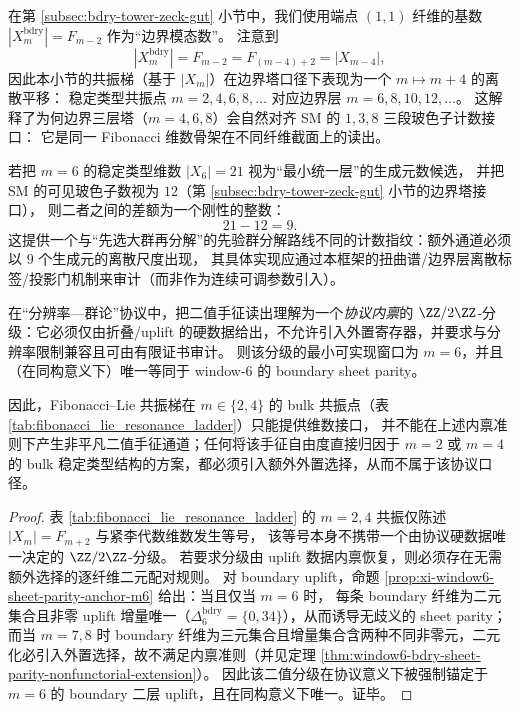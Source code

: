 \begin{remark}[与边界词塔的四步平移]\label{rem:fib-lie-resonance-shift-by-4}
在第 \ref{subsec:bdry-tower-zeck-gut} 小节中，我们使用端点 \((1,1)\) 纤维的基数
\(
|X_m^{\mathrm{bdry}}|=F_{m-2}
\)
作为“边界模态数”。
注意到
\[
|X_m^{\mathrm{bdry}}|=F_{m-2}=F_{(m-4)+2}=|X_{m-4}|,
\]
因此本小节的共振梯（基于 \(|X_m|\)）在边界塔口径下表现为一个 \(m\mapsto m+4\) 的离散平移：
稳定类型共振点 \(m=2,4,6,8,\dots\) 对应边界层 \(m=6,8,10,12,\dots\)。
这解释了为何边界三层塔（\(m=4,6,8\)）会自然对齐 SM 的 \(1,3,8\) 三段玻色子计数接口：
它是同一 Fibonacci 维数骨架在不同纤维截面上的读出。
\end{remark}

\begin{remark}[最小额外生成元计数：\(21-12=9\)]\label{rem:fib-lie-extra-9}
若把 \(m=6\) 的稳定类型维数 \( |X_6|=21 \) 视为“最小统一层”的生成元数候选，
并把 SM 的可见玻色子数视为 \(12\)（第 \ref{subsec:bdry-tower-zeck-gut} 小节的边界塔接口），
则二者之间的差额为一个刚性的整数：
\[
21-12=9.
\]
这提供一个与“先选大群再分解”的先验群分解路线不同的计数指纹：额外通道必须以 \(9\) 个生成元的离散尺度出现，
其具体实现应通过本框架的扭曲谱/边界层离散标签/投影门机制来审计（而非作为连续可调参数引入）。
\end{remark}

\begin{theorem}\label{thm:window6-chirality-anchor-minimal}
在“分辨率—群论”协议中，把二值手征读出理解为一个\emph{协议内禀}的 \(\ZZ/2\ZZ\)-分级：它必须仅由折叠/uplift 的硬数据给出，不允许引入外置寄存器，并要求与分辨率限制兼容且可由有限证书审计。
则该分级的最小可实现窗口为 \(m=6\)，并且（在同构意义下）唯一等同于 window-\(6\) 的 boundary sheet parity。
\par
因此，Fibonacci--Lie 共振梯在 \(m\in\{2,4\}\) 的 bulk 共振点（表 \ref{tab:fibonacci_lie_resonance_ladder}）只能提供维数接口，
并不能在上述内禀准则下产生非平凡二值手征通道；任何将该手征自由度直接归因于 \(m=2\) 或 \(m=4\) 的 bulk 稳定类型结构的方案，都必须引入额外外置选择，从而不属于该协议口径。
\end{theorem}

\begin{proof}
表 \ref{tab:fibonacci_lie_resonance_ladder} 的 \(m=2,4\) 共振仅陈述 \(|X_m|=F_{m+2}\) 与紧李代数维数发生等号，
该等号本身不携带一个由协议硬数据唯一决定的 \(\ZZ/2\ZZ\)-分级。
若要求分级由 uplift 数据内禀恢复，则必须存在无需额外选择的逐纤维二元配对规则。
对 boundary uplift，命题 \ref{prop:xi-window6-sheet-parity-anchor-m6} 给出：当且仅当 \(m=6\) 时，
每条 boundary 纤维为二元集合且非零 uplift 增量唯一（\(\Delta_6^{\mathrm{bdry}}=\{0,34\}\)），从而诱导无歧义的 sheet parity；
而当 \(m=7,8\) 时 boundary 纤维为三元集合且增量集合含两种不同非零元，二元化必引入外置选择，故不满足内禀准则（并见定理 \ref{thm:window6-bdry-sheet-parity-nonfunctorial-extension}）。
因此该二值分级在协议意义下被强制锚定于 \(m=6\) 的 boundary 二层 uplift，且在同构意义下唯一。证毕。
\end{proof}

